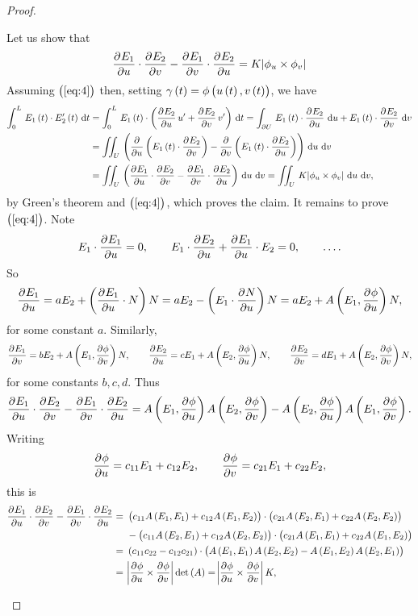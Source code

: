 \begin{proof}
\begin{itemize}
Let us show that
\begin{equation}
\label{eq:4}
\dpd{E_1}{u} \cdot \dpd{E_2}{v} - \dpd{E_1}{v} \cdot \dpd{E_2}{u} = K\abs{\phi_u \times \phi_v}
\end{equation}
Assuming $ \br{\ref{eq:4}} $ then, setting $ \gamma\br{t} = \phi\br{u\br{t}, v\br{t}} $, we have
\begin{align*}
\intd{0}{L}{E_1\br{t} \cdot E_2'\br{t}}{t}
& = \intd{0}{L}{E_1\br{t} \cdot \br{\dpd{E_2}{u}u' + \dpd{E_2}{v}v'}}{t}
= \int_{\partial U} \, E_1\br{t} \cdot \dpd{E_2}{u} \, \dif u + E_1\br{t} \cdot \dpd{E_2}{v} \, \dif v \\
& = \iintd{U}{\br{\dpd{}{u}\br{E_1\br{t} \cdot \dpd{E_2}{v}} - \dpd{}{v}\br{E_1\br{t} \cdot \dpd{E_2}{u}}}}{u}{v} \\
& = \iintd{U}{\br{\dpd{E_1}{u} \cdot \dpd{E_2}{v} - \dpd{E_1}{v} \cdot \dpd{E_2}{u}}}{u}{v} = \iintd{U}{K\abs{\phi_u \times \phi_v}}{u}{v},
\end{align*}
by Green's theorem and $ \br{\ref{eq:4}} $, which proves the claim. It remains to prove $ \br{\ref{eq:4}} $. Note
$$ E_1 \cdot \dpd{E_1}{u} = 0, \qquad E_1 \cdot \dpd{E_2}{u} + \dpd{E_1}{u} \cdot E_2 = 0, \qquad \dots. $$
So
$$ \dpd{E_1}{u} = aE_2 + \br{\dpd{E_1}{u} \cdot N}N = aE_2 - \br{E_1 \cdot \dpd{N}{u}}N = aE_2 + A\br{E_1, \dpd{\phi}{u}}N, $$
for some constant $ a $. Similarly,
$$ \dpd{E_1}{v} = bE_2 + A\br{E_1, \dpd{\phi}{v}}N, \qquad \dpd{E_2}{u} = cE_1 + A\br{E_2, \dpd{\phi}{u}}N, \qquad \dpd{E_2}{v} = dE_1 + A\br{E_2, \dpd{\phi}{v}}N, $$
for some constants $ b, c, d $. Thus
$$ \dpd{E_1}{u} \cdot \dpd{E_2}{v} - \dpd{E_1}{v} \cdot \dpd{E_2}{u} = A\br{E_1, \dpd{\phi}{u}}A\br{E_2, \dpd{\phi}{v}} - A\br{E_2, \dpd{\phi}{u}}A\br{E_1, \dpd{\phi}{v}}. $$
Writing
$$ \dpd{\phi}{u} = c_{11}E_1 + c_{12}E_2, \qquad \dpd{\phi}{v} = c_{21}E_1 + c_{22}E_2, $$
this is
\begin{align*}
\dpd{E_1}{u} \cdot \dpd{E_2}{v} - \dpd{E_1}{v} \cdot \dpd{E_2}{u}
= \ & \br{c_{11}A\br{E_1, E_1} + c_{12}A\br{E_1, E_2}} \cdot \br{c_{21}A\br{E_2, E_1} + c_{22}A\br{E_2, E_2}} \\
& - \br{c_{11}A\br{E_2, E_1} + c_{12}A\br{E_2, E_2}} \cdot \br{c_{21}A\br{E_1, E_1} + c_{22}A\br{E_1, E_2}} \\
= \ & \br{c_{11}c_{22} - c_{12}c_{21}} \cdot \br{A\br{E_1, E_1}A\br{E_2, E_2} - A\br{E_1, E_2}A\br{E_2, E_1}} \\
= \ & \abs{\dpd{\phi}{u} \times \dpd{\phi}{v}}\det\br{A}
= \abs{\dpd{\phi}{u} \times \dpd{\phi}{v}}K,
\end{align*}

\end{itemize}
\end{proof}
